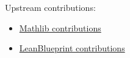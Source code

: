 Upstream contributions:

\begin{itemize}
    \item \href{https://github.com/leanprover-community/mathlib4/pulls?q=is%3Apr+is%3Abody+EquationalTheories+}{Mathlib contributions}
    \item \href{https://github.com/PatrickMassot/leanblueprint/pulls?q=is%3Apr+in%3Abody+EquationalTheories+}{LeanBlueprint contributions}
\end{itemize}
